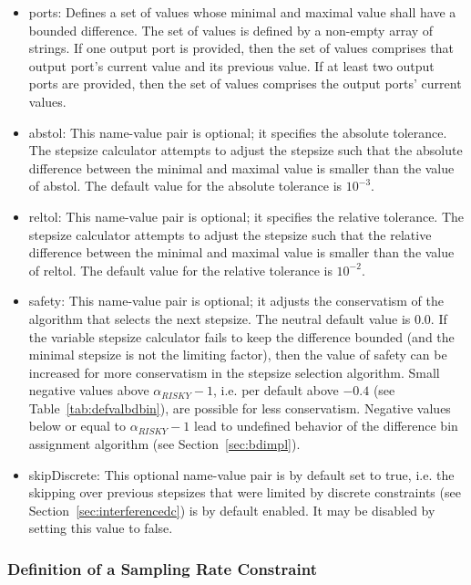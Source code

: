 	\begin{itemize}
		\item {\ttfamily ports:} Defines a set of values whose minimal and maximal value shall have a bounded difference. The set of values is defined by a non-empty array of strings. If one output port is provided, then the set of values comprises that output port's current value and its previous value. If at least two output ports are provided, then the set of values comprises the output ports' current values.
		\item	{\ttfamily abstol:} This name-value pair is optional; it specifies the absolute tolerance. The stepsize calculator attempts to adjust the stepsize such that the absolute difference between the minimal and maximal value is smaller than the value of {\ttfamily abstol}. The default value for the absolute tolerance is $10^{-3}$.
		\item {\ttfamily reltol:} This name-value pair is optional; it specifies the relative tolerance. The stepsize calculator attempts to adjust the stepsize such that the relative difference between the minimal and maximal value is smaller than the value of {\ttfamily reltol}. The default value for the relative tolerance is $10^{-2}$.
		\item {\ttfamily safety:} This name-value pair is optional; it adjusts the conservatism of the algorithm that selects the next stepsize. The neutral default value is 0.0. If the variable stepsize calculator fails to keep the difference bounded (and the minimal stepsize is not the limiting factor), then the value of {\ttfamily safety} can be increased for more conservatism in the stepsize selection algorithm. Small negative values above $\alpha_{RISKY}-1$, i.e. per default above $-0.4$ (see Table~\ref{tab:defvalbdbin}), are possible for less conservatism. Negative values below or equal to $\alpha_{RISKY}-1$ lead to undefined behavior of the difference bin assignment algorithm (see Section~\ref{sec:bdimpl}).
		\item {\ttfamily skipDiscrete:} This optional name-value pair is by default set to {\ttfamily true}, i.e. the skipping over previous stepsizes that were limited by discrete constraints (see Section~\ref{sec:interferencedc}) is by default enabled. It may be disabled by setting this value to {\ttfamily false}.
	\end{itemize}
	
	\subsubsection{Definition of a Sampling Rate Constraint}\label{sec:defsrconstraint}
	
